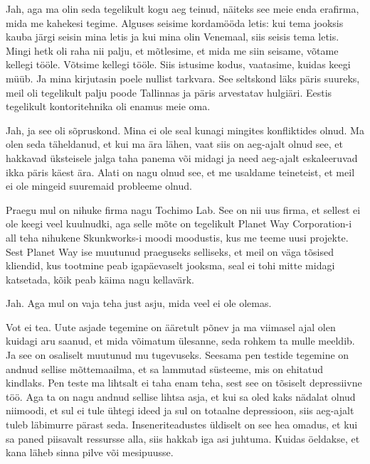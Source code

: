 
Jah, aga ma olin seda  tegelikult kogu aeg teinud, näiteks see meie enda erafirma, mida me kahekesi tegime. Alguses seisime kordamööda letis: kui tema jooksis kauba järgi seisin mina letis  ja kui mina olin Venemaal, siis seisis tema letis. Mingi hetk oli raha nii palju, et mõtlesime, et mida me siin seisame, võtame kellegi tööle. Võtsime kellegi tööle. Siis istusime kodus, vaatasime, kuidas keegi müüb. Ja mina kirjutasin poele  nullist tarkvara. See seltskond läks päris suureks, meil oli tegelikult palju poode Tallinnas ja päris arvestatav hulgiäri. Eestis tegelikult kontoritehnika oli enamus meie oma. 


Jah, ja see oli sõpruskond. Mina ei ole seal kunagi mingites konfliktides olnud. Ma olen seda täheldanud, et kui ma ära lähen, vaat siis on aeg-ajalt olnud see, et hakkavad üksteisele jalga  taha panema või midagi ja need aeg-ajalt eskaleeruvad ikka päris käest ära. Alati on nagu olnud  see, et me usaldame teineteist, et meil ei ole mingeid suuremaid probleeme olnud. 


Praegu mul on nihuke firma nagu Tochimo Lab. See on nii uus firma, et sellest ei ole keegi veel kuulnudki, aga selle mõte on tegelikult Planet Way Corporation-i all teha nihukene Skunkworks-i moodi moodustis, kus me teeme uusi projekte. Sest Planet Way ise muutunud praeguseks selliseks, et meil on väga tõsised kliendid, kus tootmine peab igapäevaselt jooksma, seal ei tohi mitte midagi katsetada,  kõik peab  käima nagu kellavärk. 


Jah. Aga mul on vaja teha just asju, mida veel ei ole olemas. 


Vot ei tea. Uute asjade tegemine on ääretult põnev ja ma  viimasel ajal olen kuidagi  aru saanud, et mida võimatum ülesanne, seda rohkem ta mulle meeldib. Ja see on osaliselt muutunud mu tugevuseks. Seesama pen testide tegemine on andnud sellise mõttemaailma, et sa lammutad süsteeme, mis on ehitatud kindlaks. Pen teste  ma lihtsalt ei taha enam teha, sest see on tõsiselt depressiivne töö. Aga ta on nagu andnud sellise lihtsa asja, et kui sa oled kaks nädalat olnud niimoodi, et sul ei tule ühtegi ideed ja sul on totaalne depressioon, siis aeg-ajalt tuleb läbimurre pärast seda. Inseneriteadustes üldiselt on see hea omadus, et kui sa paned piisavalt ressursse alla, siis hakkab iga asi juhtuma. Kuidas öeldakse, et kana läheb sinna pilve või mesipuusse.

